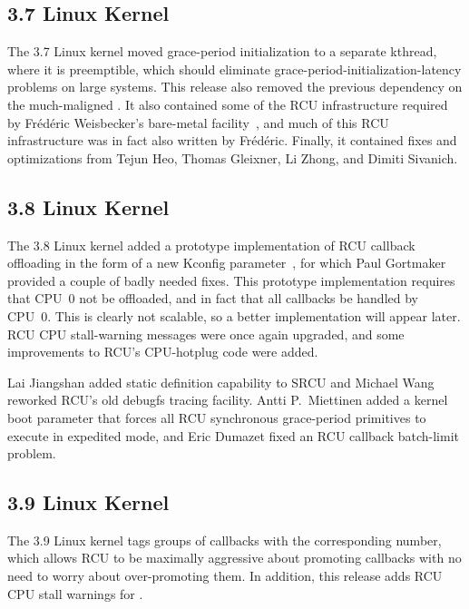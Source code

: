 \subsection{3.7 Linux Kernel}

The 3.7 Linux kernel moved grace-period initialization to a separate
kthread, where it is preemptible, which should eliminate
grace-period-initialization-latency problems on large systems.
This release also removed the previous  dependency
on the much-maligned .
It also contained some of the RCU infrastructure required by
Fr\'ed\'eric Weisbecker's  bare-metal
facility~\cite{JonCorbet2013NO-HZ-FULL}, and much of this RCU
infrastructure was in fact also written by Fr\'ed\'eric.
Finally, it contained fixes and optimizations from Tejun Heo,
Thomas Gleixner, Li Zhong, and Dimiti Sivanich.

\subsection{3.8 Linux Kernel}

The 3.8 Linux kernel added a prototype implementation of RCU callback
offloading in the form of a new  Kconfig
parameter~\cite{JonCorbet2012NOCB}, for which Paul Gortmaker provided
a couple of badly needed fixes.
This prototype implementation requires that CPU~0 not be offloaded,
and in fact that all callbacks be handled by CPU~0.
This is clearly not scalable, so a better implementation will appear later.
RCU CPU stall-warning messages were once again upgraded, and some
improvements to RCU's CPU-hotplug code were added.

Lai Jiangshan added static definition capability to SRCU and Michael
Wang reworked RCU's old debugfs tracing facility.
Antti P.~Miettinen added a kernel boot parameter that forces all RCU
synchronous grace-period primitives to execute in expedited mode,
and Eric Dumazet fixed an RCU callback batch-limit problem.

\subsection{3.9 Linux Kernel}

The 3.9 Linux kernel tags groups of callbacks with the corresponding
number, which allows RCU to be maximally aggressive about promoting
callbacks with no need to worry about over-promoting them.
In addition, this release adds RCU CPU stall warnings for .

